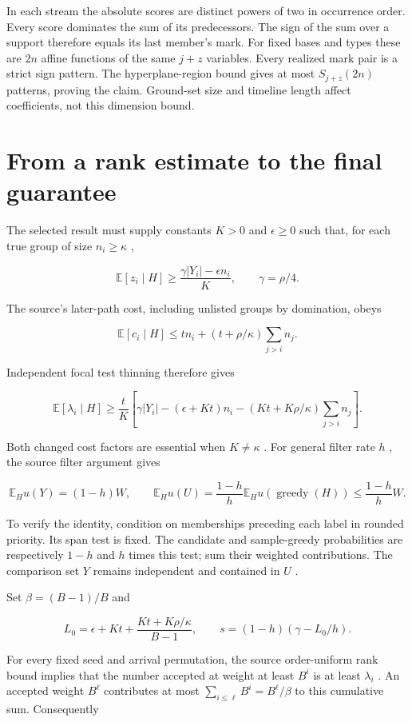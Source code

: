 \documentclass[11pt]{article}
\begin{document}
In each stream the absolute scores are distinct powers of two in occurrence order. Every score dominates the sum of its predecessors. The sign of the sum over a support therefore equals its last member's mark. For fixed bases and types these are \(2n\) affine functions of the same \(j+z\) variables. Every realized mark pair is a strict sign pattern. The hyperplane-region bound gives at most \(S_{j+z}(2n)\) patterns, proving the claim. Ground-set size and timeline length affect coefficients, not this dimension bound.

\section{From a rank estimate to the final guarantee}\label{from-a-rank-estimate-to-the-final-guarantee}

The selected result must supply constants \(K>0\) and \(\epsilon\ge0\) such that, for each true group of size \(n_i\ge\kappa\) ,

\[\mathbb E[z_i\mid H]\ge\frac{\gamma|Y_i|-\epsilon n_i}{K},\qquad\gamma=\rho/4.\]

The source's later-path cost, including unlisted groups by domination, obeys

\[\mathbb E[c_i\mid H]\le t n_i+(t+\rho/\kappa)\sum_{j>i}n_j.\]

Independent focal test thinning therefore gives

\[\mathbb E[\lambda_i\mid H]\ge\frac tK\left[
\gamma|Y_i|-(\epsilon+Kt)n_i-
(Kt+K\rho/\kappa)\sum_{j>i}n_j\right].\]

Both changed cost factors are essential when \(K\ne\kappa\) . For general filter rate \(h\) , the source filter argument gives

\[\mathbb E_H u(Y)=(1-h)W,\qquad
\mathbb E_H u(U)=\frac{1-h}{h}\mathbb E_Hu(\operatorname{greedy}(H))
\le\frac{1-h}{h}W.\]

To verify the identity, condition on memberships preceding each label in rounded priority. Its span test is fixed. The candidate and sample-greedy probabilities are respectively \(1-h\) and \(h\) times this test; sum their weighted contributions. The comparison set \(Y\) remains independent and contained in \(U\) .

Set \(\beta=(B-1)/B\) and

\[L_0=\epsilon+Kt+\frac{Kt+K\rho/\kappa}{B-1},\qquad
s=(1-h)(\gamma-L_0/h).\]

For every fixed seed and arrival permutation, the source order-uniform rank bound implies that the number accepted at weight at least \(B^i\) is at least \(\lambda_i\) . An accepted weight \(B^\ell\) contributes at most \(\sum_{i\le\ell}B^i=B^\ell/\beta\) to this cumulative sum. Consequently
\end{document}
